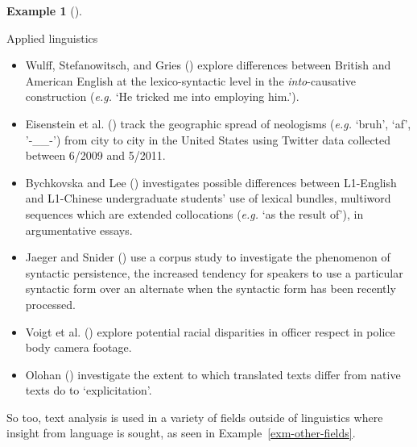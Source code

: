 \documentclass[
  letterpaper,
  DIV=11,
  numbers=noendperiod]{scrreprt}
\providecommand{\tightlist}{%
  \setlength{\itemsep}{0pt}\setlength{\parskip}{0pt}}\usepackage{longtable,booktabs,array}
\theoremstyle{definition}
\newtheorem{example}{Example}[chapter]
\theoremstyle{remark}
\begin{document}
\begin{example}[]\protect\hypertarget{exm-linguistic-applied}{}\label{exm-linguistic-applied}

Applied linguistics

\begin{itemize}
\tightlist
\item
  Wulff, Stefanowitsch, and Gries ()
  explore differences between British and American English at the
  lexico-syntactic level in the \emph{into}-causative construction
  (\emph{e.g.} `He tricked me into employing him.').
\item
  Eisenstein et al. () track the
  geographic spread of neologisms (\emph{e.g.} `bruh', `af', '-\_\_-')
  from city to city in the United States using Twitter data collected
  between 6/2009 and 5/2011.
\item
  Bychkovska and Lee () investigates
  possible differences between L1-English and L1-Chinese undergraduate
  students' use of lexical bundles, multiword sequences which are
  extended collocations (\emph{e.g.} `as the result of'), in
  argumentative essays.
\item
  Jaeger and Snider () use a corpus study
  to investigate the phenomenon of syntactic persistence, the increased
  tendency for speakers to use a particular syntactic form over an
  alternate when the syntactic form has been recently processed.
\item
  Voigt et al. () explore potential racial
  disparities in officer respect in police body camera footage.
\item
  Olohan () investigate the extent to
  which translated texts differ from native texts do to `explicitation'.
\end{itemize}

\end{example}

So too, text analysis is used in a variety of fields outside of
linguistics where insight from language is sought, as seen in
Example~\ref{exm-other-fields}.
\end{document}
